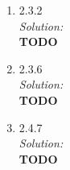 \documentclass[10pt]{amsart}
\theoremstyle{nonumberplain}
\begin{document}
\begin{enumerate}[label={\bf {\arabic*}:}]
\item 2.3.2 \\
\textit{Solution:} \\
\textbf{TODO} \\

\item 2.3.6 \\
\textit{Solution:} \\
\textbf{TODO} \\

\item 2.4.7 \\
\textit{Solution:} \\
\textbf{TODO} \\

\end{enumerate}
\end{document}
